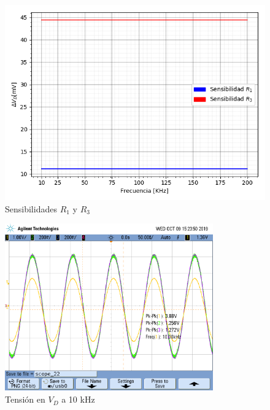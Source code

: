 \begin{figure}[H]
\centering
\includegraphics[scale=0.7]{Graficos/Sensibilidad}
\caption{Sensibilidades $R_1$ y $R_3$}
\label{fig:Sensibilidades}
\end{figure}



\begin{figure}[H]
\centering
\includegraphics[width=0.8\textwidth,trim={0 3.45cm 0.1cm 1.75cm},clip]{Mediciones/Tensiones_10_KHz}
\caption{Tensión en $V_D$ a 10 kHz}
\label{fig:Tensiones_10_KHz}
\end{figure}

